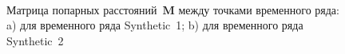 \begin{figure}[h!t]\center
{}
\\
\caption{Матрица попарных расстояний~$\textbf{M}$ между точками временного ряда: a) для временного ряда Synthetic~1; b) для временного ряда Synthetic~2}
\label{fig_synthetic_distance}
\end{figure}


